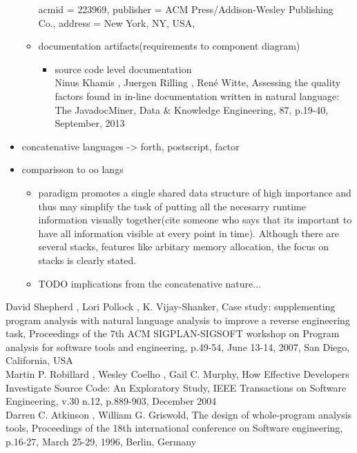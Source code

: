 \begin{itemize}
\begin{itemize}
{	 acmid = {223969},
	 publisher = {ACM Press/Addison-Wesley Publishing Co.},
	 address = {New York, NY, USA},
	}
	\item documentation artifacts(requirements to component diagram)
		\begin{itemize}
		\item source code level documentation \\ Ninus Khamis , Juergen Rilling , René Witte, Assessing the quality factors found in in-line documentation written in natural language: The JavadocMiner, Data \& Knowledge Engineering, 87, p.19-40, September, 2013
		\end{itemize}
	\end{itemize}
\item concatenative languages -> forth, postscript, factor
\item comparisson to oo langs
	\begin{itemize}
	\item paradigm promotes a single shared data structure of high importance and thus may simplify the task of putting all the necesarry runtime information visually together(cite someone who says that its important to have all information visible at every point in time). Although there are several stacks, features like arbitary memory allocation, the focus on stacks is clearly stated.
	\end{itemize}
	\begin{itemize}
	\item TODO implications from the concatenative nature...
	\end{itemize}
\end{itemize}

David Shepherd , Lori Pollock , K. Vijay-Shanker, Case study: supplementing program analysis with natural language analysis to improve a reverse engineering task, Proceedings of the 7th ACM SIGPLAN-SIGSOFT workshop on Program analysis for software tools and engineering, p.49-54, June 13-14, 2007, San Diego, California, USA \\

Martin P. Robillard , Wesley Coelho , Gail C. Murphy, How Effective Developers Investigate Source Code: An Exploratory Study, IEEE Transactions on Software Engineering, v.30 n.12, p.889-903, December 2004\\

Darren C. Atkinson , William G. Griswold, The design of whole-program analysis tools, Proceedings of the 18th international conference on Software engineering, p.16-27, March 25-29, 1996, Berlin, Germany\\

